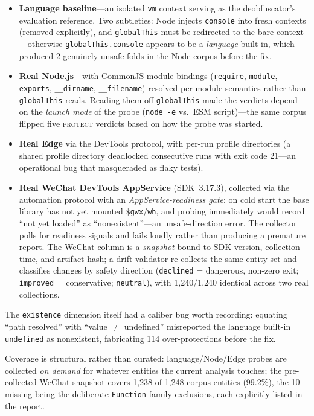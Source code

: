 \documentclass[sigconf,nonacm]{acmart}
\begin{document}
\begin{itemize}
  \item \textbf{Language baseline}---an isolated \texttt{vm} context serving as the deobfuscator's evaluation reference. Two subtleties: Node injects \texttt{console} into fresh contexts (removed explicitly), and \texttt{globalThis} must be redirected to the bare context---otherwise \texttt{globalThis.console} appears to be a \emph{language} built-in, which produced 2 genuinely unsafe folds in the Node corpus before the fix.
  \item \textbf{Real Node.js}---with CommonJS module bindings (\texttt{require}, \texttt{module}, \texttt{exports}, \texttt{\_\_dirname}, \texttt{\_\_filename}) resolved per module semantics rather than \texttt{globalThis} reads. Reading them off \texttt{globalThis} made the verdicts depend on the \emph{launch mode} of the probe (\texttt{node -e} vs.\ ESM script)---the same corpus flipped five \textsc{protect} verdicts based on how the probe was started.
  \item \textbf{Real Edge} via the DevTools protocol, with per-run profile directories (a shared profile directory deadlocked consecutive runs with exit code 21---an operational bug that masqueraded as flaky tests).
  \item \textbf{Real WeChat DevTools AppService} (SDK~3.17.3), collected via the automation protocol with an \emph{AppService-readiness gate}: on cold start the base library has not yet mounted \texttt{\$gwx}/\texttt{wh}, and probing immediately would record ``not yet loaded'' as ``nonexistent''---an unsafe-direction error. The collector polls for readiness signals and fails loudly rather than producing a premature report. The WeChat column is a \emph{snapshot} bound to SDK version, collection time, and artifact hash; a drift validator re-collects the same entity set and classifies changes by safety direction (\texttt{declined} = dangerous, non-zero exit; \texttt{improved} = conservative; \texttt{neutral}), with 1{,}240/1{,}240 identical across two real collections.
\end{itemize}

The \texttt{existence} dimension itself had a caliber bug worth recording: equating ``path resolved'' with ``value $\neq$ undefined'' misreported the language built-in \texttt{undefined} as nonexistent, fabricating 114 over-protections before the fix.

Coverage is structural rather than curated: language/Node/Edge probes are collected \emph{on demand} for whatever entities the current analysis touches; the pre-collected WeChat snapshot covers 1{,}238 of 1{,}248 corpus entities (99.2\%), the 10 missing being the deliberate \texttt{Function}-family exclusions, each explicitly listed in the report.
\end{document}
